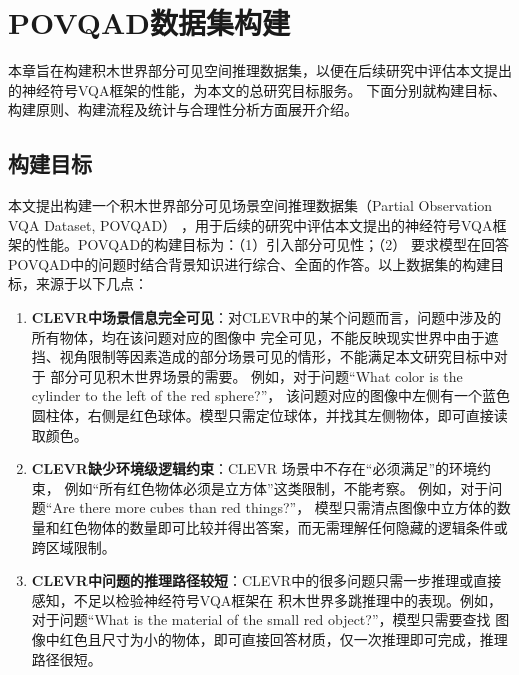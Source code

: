 \chapter{POVQAD数据集构建}\label{dataset}
本章旨在构建积木世界部分可见空间推理数据集，以便在后续研究中评估本文提出的神经符号VQA框架的性能，为本文的总研究目标服务。
下面分别就构建目标、构建原则、构建流程及统计与合理性分析方面展开介绍。
\section{构建目标}
本文提出构建一个积木世界部分可见场景空间推理数据集（Partial Observation VQA Dataset, POVQAD）
，用于后续的研究中评估本文提出的神经符号VQA框架的性能。POVQAD的构建目标为：（1）引入部分可见性；（2）
要求模型在回答POVQAD中的问题时结合背景知识进行综合、全面的作答。以上数据集的构建目标，来源于以下几点：
\begin{enumerate}[nosep]
\item \textbf{CLEVR中场景信息完全可见}：对CLEVR中的某个问题而言，问题中涉及的所有物体，均在该问题对应的图像中
完全可见，不能反映现实世界中由于遮挡、视角限制等因素造成的部分场景可见的情形，不能满足本文研究目标中对于
部分可见积木世界场景的需要。
例如，对于问题“What color is the cylinder to the left of the red sphere?”，
该问题对应的图像中左侧有一个蓝色圆柱体，右侧是红色球体。模型只需定位球体，并找其左侧物体，即可直接读取颜色。
\item \textbf{CLEVR缺少环境级逻辑约束}：CLEVR 场景中不存在“必须满足”的环境约束，
例如“所有红色物体必须是立方体”这类限制，不能考察。
例如，对于问题“Are there more cubes than red things?”，
模型只需清点图像中立方体的数量和红色物体的数量即可比较并得出答案，而无需理解任何隐藏的逻辑条件或跨区域限制。
\item \textbf{CLEVR中问题的推理路径较短}：CLEVR中的很多问题只需一步推理或直接感知，不足以检验神经符号VQA框架在
积木世界多跳推理中的表现。例如，对于问题“What is the material of the small red object?”，模型只需要查找
图像中红色且尺寸为小的物体，即可直接回答材质，仅一次推理即可完成，推理路径很短。
\end{enumerate}

